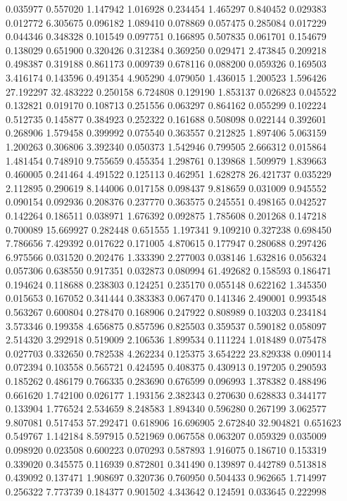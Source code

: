 0.035977
0.557020
1.147942
1.016928
0.234454
1.465297
0.840452
0.029383
0.012772
6.305675
0.096182
1.089410
0.078869
0.057475
0.285084
0.017229
0.044346
0.348328
0.101549
0.097751
0.166895
0.507835
0.061701
0.154679
0.138029
0.651900
0.320426
0.312384
0.369250
0.029471
2.473845
0.209218
0.498387
0.319188
0.861173
0.009739
0.678116
0.088200
0.059326
0.169503
3.416174
0.143596
0.491354
4.905290
4.079050
1.436015
1.200523
1.596426
27.192297
32.483222
0.250158
6.724808
0.129190
1.853137
0.026823
0.045522
0.132821
0.019170
0.108713
0.251556
0.063297
0.864162
0.055299
0.102224
0.512735
0.145877
0.384923
0.252322
0.161688
0.508098
0.022144
0.392601
0.268906
1.579458
0.399992
0.075540
0.363557
0.212825
1.897406
5.063159
1.200263
0.306806
3.392340
0.050373
1.542946
0.799505
2.666312
0.015864
1.481454
0.748910
9.755659
0.455354
1.298761
0.139868
1.509979
1.839663
0.460005
0.241464
4.491522
0.125113
0.462951
1.628278
26.421737
0.035229
2.112895
0.290619
8.144006
0.017158
0.098437
9.818659
0.031009
0.945552
0.090154
0.092936
0.208376
0.237770
0.363575
0.245551
0.498165
0.042527
0.142264
0.186511
0.038971
1.676392
0.092875
1.785608
0.201268
0.147218
0.700089
15.669927
0.282448
0.651555
1.197341
9.109210
0.327238
0.698450
7.786656
7.429392
0.017622
0.171005
4.870615
0.177947
0.280688
0.297426
6.975566
0.031520
0.202476
1.333390
2.277003
0.038146
1.632816
0.056324
0.057306
0.638550
0.917351
0.032873
0.080994
61.492682
0.158593
0.186471
0.194624
0.118688
0.238303
0.124251
0.235170
0.055148
0.622162
1.345350
0.015653
0.167052
0.341444
0.383383
0.067470
0.141346
2.490001
0.993548
0.563267
0.600804
0.278470
0.168906
0.247922
0.808989
0.103203
0.234184
3.573346
0.199358
4.656875
0.857596
0.825503
0.359537
0.590182
0.058097
2.514320
3.292918
0.519009
2.106536
1.899534
0.111224
1.018489
0.075478
0.027703
0.332650
0.782538
4.262234
0.125375
3.654222
23.829338
0.090114
0.072394
0.103558
0.565721
0.424595
0.408375
0.430913
0.197205
0.290593
0.185262
0.486179
0.766335
0.283690
0.676599
0.096993
1.378382
0.488496
0.661620
1.742100
0.026177
1.193156
2.382343
0.270630
0.628833
0.344177
0.133904
1.776524
2.534659
8.248583
1.894340
0.596280
0.267199
3.062577
9.807081
0.517453
57.292471
0.618906
16.696905
2.672840
32.904821
0.651623
0.549767
1.142184
8.597915
0.521969
0.067558
0.063207
0.059329
0.035009
0.098920
0.023508
0.600223
0.070293
0.587893
1.916075
0.186710
0.153319
0.339020
0.345575
0.116939
0.872801
0.341490
0.139897
0.442789
0.513818
0.439092
0.137471
1.908697
0.320736
0.760950
0.504433
0.962665
1.714997
0.256322
7.773739
0.184377
0.901502
4.343642
0.124591
0.033645
0.222998
